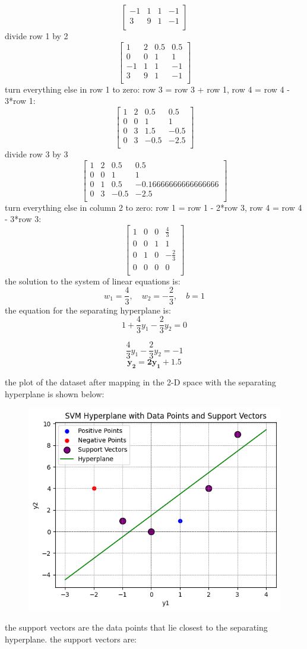 \documentclass[a3paper,12pt]{article} %
\begin{document}
\begin{enumerate}
\[\begin{bmatrix}
-1 & 1 & 1 & -1 \\
3 & 9 & 1 & -1 \\
\end{bmatrix}
\]
divide row 1 by 2
\[
\begin{bmatrix}
1 & 2 & 0.5 & 0.5 \\
0 & 0 & 1 & 1 \\
-1 & 1 & 1 & -1 \\
3 & 9 & 1 & -1 \\
\end{bmatrix}
\]
turn everything else in row 1 to zero: row 3 = row 3 + row 1, row 4 = row 4 - 3*row 1:
\[
\begin{bmatrix}
1 & 2 & 0.5 & 0.5 \\
0 & 0 & 1 & 1 \\
0 & 3 & 1.5 & -0.5 \\
0 & 3 & -0.5 & -2.5 \\
\end{bmatrix}
\]
divide row 3 by 3
\[
\begin{bmatrix}
1 & 2 & 0.5 & 0.5 \\
0 & 0 & 1 & 1 \\
0 & 1 & 0.5 & -0.16666666666666666 \\
0 & 3 & -0.5 & -2.5 \\
\end{bmatrix}
\]
turn everything else in column 2 to zero: row 1 = row 1 - 2*row 3, row 4 = row 4 - 3*row 3:
\[
\begin{bmatrix}
1 & 0 & 0 & \frac{4}{3} \\
0 & 0 & 1 & 1\\
0 & 1 & 0 & -\frac{2}{3} \\
0 & 0 & 0 & 0 \\
\end{bmatrix}
\]
the solution to the system of linear equations is:
\[
w_1 = \frac{4}{3}, \quad w_2 = -\frac{2}{3}, \quad b = 1
\]
the equation for the separating hyperplane is:
\[
1 + \frac{4}{3}y_1 - \frac{2}{3}y_2 = 0
\]

\[
\frac{4}{3}y_1 - \frac{2}{3}y_2 = -1
\]
\[
\mathbf{y_2 = 2y_1 + 1.5}
\]
    
the plot of the dataset after mapping in the 2-D space with the separating hyperplane is shown below:
    \begin{figure}[h!]
        \centering
        \includegraphics[width=0.5\linewidth]{HYPERLANE.png}
    \label{fig:separating hyperplane}
    \end{figure}
    the support vectors are the data points that lie closest to the separating hyperplane. the support vectors are:
\end{enumerate}
\end{document}
